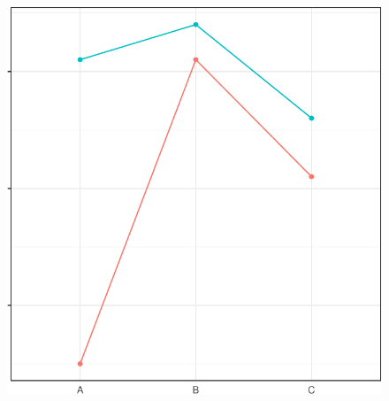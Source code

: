\documentclass[
  letterpaper,
]{scrbook}
\begin{document}
\begin{figure}
\begin{minipage}[t]{0.33\linewidth}
{{\includegraphics{./stat-tests-anova_files/figure-pdf/fig-anova-inter-example-2.pdf}

}

}

\end{minipage}%
%
\begin{minipage}[t]{0.33\linewidth}

{\centering 

}
\end{minipage}
\end{figure}
\end{document}
